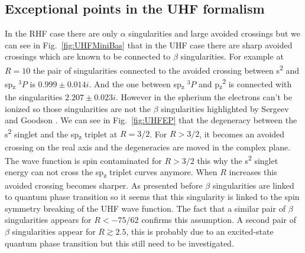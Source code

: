 \documentclass[11pt,a4paper]{article}
\begin{document}
\subsection{Exceptional points in the UHF formalism}\label{sec:uhfSing}

In the RHF case there are only $\alpha$ singularities and large avoided crossings but we can see in Fig.~\ref{fig:UHFMiniBas} that in the UHF case there are sharp avoided crossings which are known to be connected to $\beta$ singularities. For example at $R=10$ the pair of singularities connected to the avoided crossing between s\textsuperscript{2} and sp\textsubscript{z} $^{3}P$ is $0.999\pm0.014i$. And the one between sp\textsubscript{z} $^{3}P$ and p\textsubscript{z}\textsuperscript{2} is connected with the singularities $2.207\pm0.023i$. However in the spherium the electrons can't be ionized so those singularities are not the $\beta$ singularities highlighted by Sergeev and Goodson \cite{Sergeev_2005}. We can see in Fig.~\ref{fig:UHFEP} that the degeneracy between the s\textsuperscript{2} singlet and the sp\textsubscript{z} triplet at $R=3/2$. For $R>3/2$, it becomes an avoided crossing on the real axis and the degeneracies are moved in the complex plane. The wave function is spin contaminated for $R>3/2$ this why the s\textsuperscript{2} singlet energy can not cross the sp\textsubscript{z} triplet curves anymore. When $R$ increases this avoided crossing becomes sharper. As presented before $\beta$ singularities are linked to quantum phase transition so it seems that this singularity is linked to the spin symmetry breaking of the UHF wave function. The fact that a similar pair of $\beta$ singularities appears for $R<-75/62$ confirms this assumption. A second pair of $\beta$ singularities appear for $R\gtrsim 2.5$, this is probably due to an excited-state quantum phase transition but this still need to be investigated. 
\end{document}
